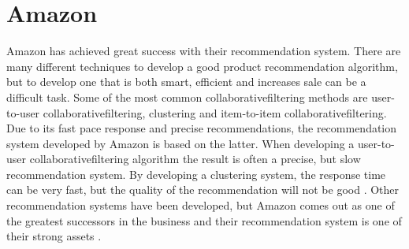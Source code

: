 \section{Amazon}
\gls{Amazon} has achieved great success with their recommendation system. There are many different techniques to develop a good product recommendation algorithm, but to develop one that is both smart, efficient and increases sale can be a difficult task. Some of the most common \gls{collaborativefiltering} methods are user-to-user \gls{collaborativefiltering}, clustering and item-to-item \gls{collaborativefiltering}. Due to its fast pace response and precise recommendations, the recommendation system developed by \gls{Amazon} is based on the latter. When developing a user-to-user \gls{collaborativefiltering} algorithm the result is often a precise, but slow recommendation system. By developing a clustering system, the response time can be very fast, but the quality of the recommendation will not be good \cite{AmazonRecommendations}. Other recommendation systems have been developed, but \gls{Amazon} comes out as one of the greatest successors in the business and their recommendation system is one of their strong assets \cite{AmazonSuccess2}.
